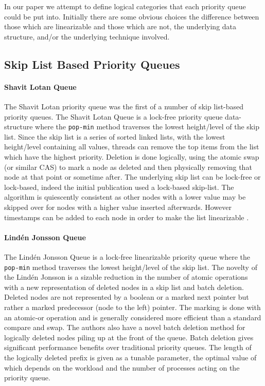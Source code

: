 
In our paper we attempt to define logical categories that each priority queue could be put into. Initially there are some obvious choices the difference between those which are linearizable and those which are not, the underlying data structure, and/or the underlying technique involved.

\subsection{Skip List Based Priority Queues}

\paragraph{Shavit Lotan Queue} The Shavit Lotan priority queue was the first of a number of skip list-based priority queues. \cite{ShavitLotanQueue} The Shavit Lotan Queue is a lock-free priority queue data-structure where the \texttt{pop-min} method traverses the lowest height/level of the skip list. Since the skip list is a series of sorted linked lists, with the lowest height/level containing all values, threads can remove the top items from the list which have the highest priority. Deletion is done logically, using the atomic swap (or similar CAS) to mark a node as deleted and then physically removing that node at that point or sometime after. The underlying skip list can be lock-free or lock-based, indeed the initial publication used a lock-based skip-list. The algorithm is quiescently consistent as other nodes with a lower value may be skipped over for nodes with a higher value inserted afterwards. However timestamps can be added to each node in order to make the list linearizable \cite{Linearizability}.

\paragraph{Lind{\'e}n Jonsson Queue} The Lind{\'e}n Jonsson Queue \cite{LindenPriority} is a lock-free linearizable priority queue where the \texttt{pop-min} method traverses the lowest height/level of the skip list. The novelty of the Lind{\'e}n Jonsson is a sizable reduction in the number of atomic operations with a new representation of deleted nodes in a skip list and batch deletion. Deleted nodes are not represented by a boolean or a marked next pointer but rather a marked predecessor (node to the left) pointer. The marking is done with an atomic-or operation and is generally considered more efficient than a standard compare and swap. The authors also have a novel batch deletion method for logically deleted nodes piling up at the front of the queue. Batch deletion gives significant performance benefits over traditional priority queues. The length of the logically deleted prefix is given as a tunable parameter, the optimal value of which depends on the workload and the number of processes acting on the priority queue.

